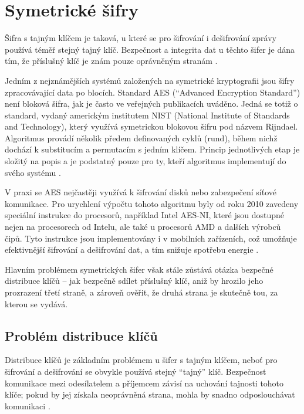\section{Symetrické šifry}
Šifra s tajným klíčem je taková, u které se pro šifrování i dešifrování zprávy používá téměř stejný tajný klíč. Bezpečnost a integrita dat u těchto šifer je dána tím, že příslušný klíč je znám pouze oprávněným stranám \parencite{tesar2021}.

Jedním z nejznámějších systémů založených na symetrické kryptografii jsou šifry zpracovávající data po blocích. Standard AES (\enquote{Advanced Encryption Standard}) není bloková šifra, jak je často ve veřejných publikacích uváděno. Jedná se totiž o standard, vydaný americkým institutem NIST (National Institute of Standards and Technology), který využívá symetrickou blokovou šifru pod názvem Rijndael. Algoritmus provádí několik předem definovaných cyklů (rund), během nichž dochází k substitucím a permutacím s jedním klíčem. Princip jednotlivých etap je složitý na popis a je podstatný pouze pro ty, kteří algoritmus implementují do svého systému \parencite{nist2023}.

V praxi se AES nejčastěji využívá k šifrování disků nebo zabezpečení síťové komunikace. Pro urychlení výpočtu tohoto algoritmu byly od roku 2010 zavedeny speciální instrukce do procesorů, například Intel\textregistered{} AES-NI, které jsou dostupné nejen na procesorech od Intelu, ale také u procesorů AMD a dalších výrobců čipů. Tyto instrukce jsou implementovány i v mobilních zařízeních, což umožňuje efektivnější šifrování a dešifrování dat, a tím snižuje spotřebu energie \mbox{\textcite{abdallah2020}.}

Hlavním problémem symetrických šifer však stále zůstává otázka bezpečné distribuce klíčů – jak bezpečně sdílet příslušný klíč, aniž by hrozilo jeho prozrazení třetí straně, a zároveň ověřit, že druhá strana je skutečně tou, za kterou se vydává.

\subsection{Problém distribuce klíčů}
\label{sec:distribuce-klicu}

Distribuce klíčů je základním problémem u šifer s tajným klíčem, neboť pro šifrování a dešifrování se obvykle používá stejný \enquote{tajný} klíč. Bezpečnost komunikace mezi odesílatelem a příjemcem závisí na uchování tajnosti tohoto klíče; pokud by jej získala neoprávněná strana, mohla by snadno odposlouchávat komunikaci \parencite{tesar2021}.

